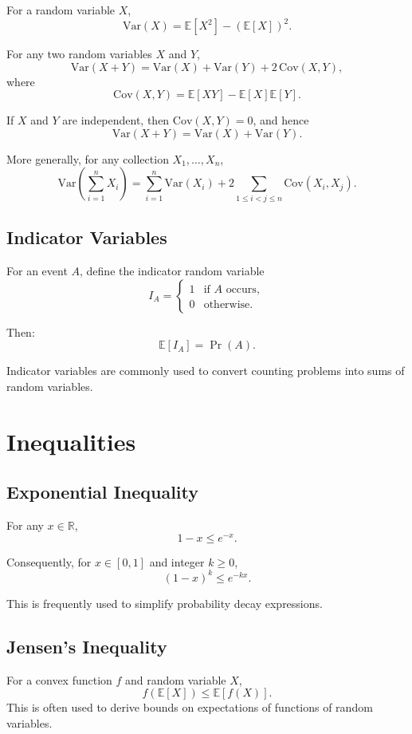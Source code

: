 \documentclass[11pt,openany]{book}
\begin{document}
For a random variable $X$,
\[
\mathrm{Var}(X)=\mathbb{E}[X^2]-\left(\mathbb{E}[X]\right)^2.
\]

For any two random variables $X$ and $Y$,
\[
\mathrm{Var}(X+Y)=\mathrm{Var}(X)+\mathrm{Var}(Y)+2\,\mathrm{Cov}(X,Y),
\]
where
\[
\mathrm{Cov}(X,Y)=\mathbb{E}[XY]-\mathbb{E}[X]\mathbb{E}[Y].
\]

If $X$ and $Y$ are independent, then $\mathrm{Cov}(X,Y)=0$, and hence
\[
\mathrm{Var}(X+Y)=\mathrm{Var}(X)+\mathrm{Var}(Y).
\]

More generally, for any collection $X_1,\dots,X_n$,
\[
\mathrm{Var}\left(\sum_{i=1}^n X_i\right)
=
\sum_{i=1}^n \mathrm{Var}(X_i)
+
2\sum_{1\le i<j\le n}\mathrm{Cov}(X_i,X_j).
\]

\section{Indicator Variables}
\label{indicator_variables}
For an event $A$, define the indicator random variable
\[
I_A=
\begin{cases}
1 & \text{if } A \text{ occurs},\\
0 & \text{otherwise}.
\end{cases}
\]

Then:
\[
\mathbb{E}[I_A]=\Pr(A).
\]

Indicator variables are commonly used to convert counting problems into sums of random variables.

\chapter{Inequalities}
\section{Exponential Inequality}
\label{exp_inequality}
For any $x \in \mathbb{R}$,
\[
1-x \le e^{-x}.
\]

Consequently, for $x \in [0,1]$ and integer $k\ge 0$,
\[
(1-x)^k \le e^{-kx}.
\]

This is frequently used to simplify probability decay expressions.

\section{Jensen’s Inequality}
\label{jensen}
For a convex function \(f\) and random variable \(X\),
\[
f(\mathbb{E}[X]) \le \mathbb{E}[f(X)].
\]
This is often used to derive bounds on expectations of functions of random variables.
\end{document}
